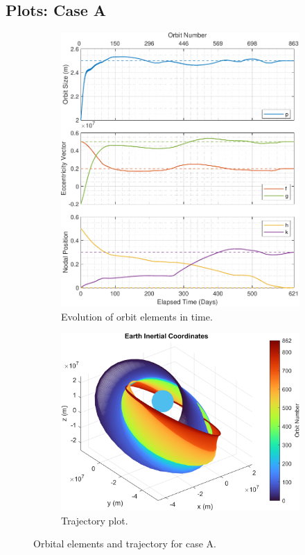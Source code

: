 \subsection{Plots: Case A}
\begin{figure}[H]
  \centering
  \begin{subfigure}[t]{0.4\textwidth}
    \includegraphics[width=\textwidth]{figures/benchmark_transfer/orbital_elements.pdf}
    \caption{Evolution of orbit elements in time.}
    \label{fig:results_a_a}
  \end{subfigure}
  \begin{subfigure}[t]{0.59\textwidth}
    \includegraphics[width=\textwidth]{figures/benchmark_transfer/trajectory_plot.png}
    \caption{Trajectory plot.}
    \label{fig:results_a_b}
  \end{subfigure}
  \caption{Orbital elements and trajectory for case A.}
  \label{fig:results_a}
\end{figure}

